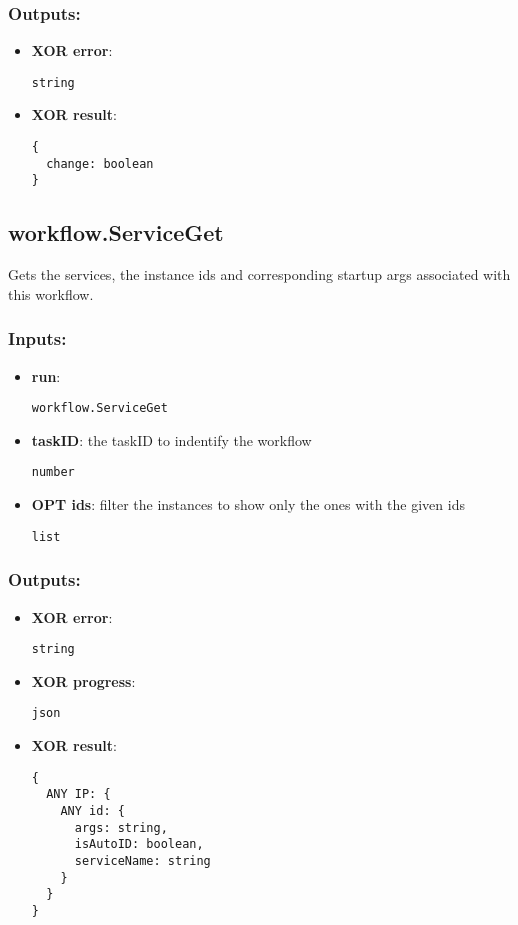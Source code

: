 \subsubsection*{Outputs:}
\begin{itemize}
    \item \textbf{XOR error}: 
\begin{lstlisting}
string
\end{lstlisting}
    \item \textbf{XOR result}: 
\begin{lstlisting}
{
  change: boolean
}
\end{lstlisting}
  \end{itemize}

\subsection{workflow.ServiceGet}
\label{ch:builtinservices:workflow.ServiceGet}
Gets the services, the instance ids and corresponding startup args associated with this workflow.
\subsubsection*{Inputs:}
\begin{itemize}
    \item \textbf{run}: 
\begin{lstlisting}
workflow.ServiceGet
\end{lstlisting}
    \item \textbf{taskID}: the taskID to indentify the workflow
\begin{lstlisting}
number
\end{lstlisting}
    \item \textbf{OPT ids}: filter the instances to show only the ones with the given ids
\begin{lstlisting}
list
\end{lstlisting}
  \end{itemize}

\subsubsection*{Outputs:}
\begin{itemize}
    \item \textbf{XOR error}: 
\begin{lstlisting}
string
\end{lstlisting}
    \item \textbf{XOR progress}: 
\begin{lstlisting}
json
\end{lstlisting}
    \item \textbf{XOR result}: 
\begin{lstlisting}
{
  ANY IP: {
    ANY id: {
      args: string, 
      isAutoID: boolean, 
      serviceName: string
    }
  }
}
\end{lstlisting}
  \end{itemize}

